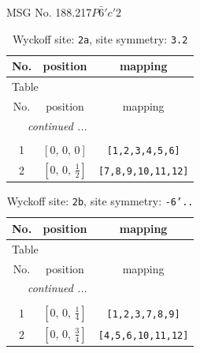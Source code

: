 \documentclass[fleqn,8pt]{jsarticle}
\begin{document}
\setcounter{MaxMatrixCols}{32}

\renewcommand{\tablename}{Table~}
\renewcommand{\figurename}{Figure~}
\begin{center}
\LARGE
MSG No. 188.217\quad$P\bar{6}'c'2$
\end{center}
\renewcommand{\arraystretch}{1.2}
\begin{longtable}{ccc}
\caption{Wyckoff site: {\tt 2a}, site symmetry: {\tt 3.2}}
 \\
 \hline \hline
No. & position & mapping \\ \hline \endfirsthead

\multicolumn{2}{l}{\tablename\ \thetable{}} \\
 \hline \hline
No. & position & mapping \\ \hline \endhead

 \hline \hline
\multicolumn{2}{r}{\footnotesize\it continued ...} \\ \endfoot

 \hline \hline
\multicolumn{2}{r}{} \\ \endlastfoot

1 & $\left[ 0,\, 0,\, 0 \right]$ & {\tt [1,2,3,4,5,6]} \\ \hline
2 & $\left[ 0,\, 0,\, \frac{1}{2} \right]$ & {\tt [7,8,9,10,11,12]} \\
\end{longtable}
\renewcommand{\arraystretch}{1.2}
\begin{longtable}{ccc}
\caption{Wyckoff site: {\tt 2b}, site symmetry: {\tt -6'..}}
 \\
 \hline \hline
No. & position & mapping \\ \hline \endfirsthead

\multicolumn{2}{l}{\tablename\ \thetable{}} \\
 \hline \hline
No. & position & mapping \\ \hline \endhead

 \hline \hline
\multicolumn{2}{r}{\footnotesize\it continued ...} \\ \endfoot

 \hline \hline
\multicolumn{2}{r}{} \\ \endlastfoot

1 & $\left[ 0,\, 0,\, \frac{1}{4} \right]$ & {\tt [1,2,3,7,8,9]} \\ \hline
2 & $\left[ 0,\, 0,\, \frac{3}{4} \right]$ & {\tt [4,5,6,10,11,12]} \\
\end{longtable}
\end{document}
